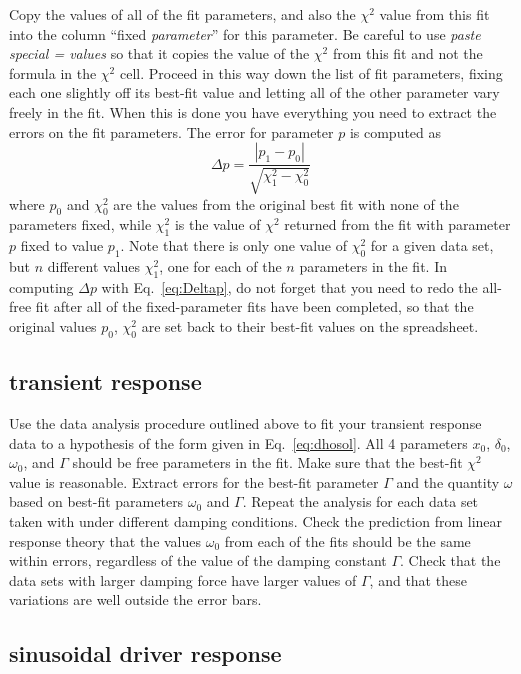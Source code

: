 \documentclass{revtex4}
\begin{document}
Copy the values
of all of the fit parameters, and also the $\chi^2$ value from this fit into
the column ``fixed {\em parameter}'' for this parameter.  Be careful to use
{\em paste special = values} so that it copies the value of the $\chi^2$
from this fit and not the formula in the $\chi^2$ cell.  Proceed in this
way down the list of fit parameters, fixing each one slightly off its 
best-fit value and letting all of the other parameter vary freely in the fit.
When this is done you have everything you need to extract the errors on the
fit parameters.  The error for parameter $p$ is computed as
\begin{equation}
\Delta p = \frac{|p_1 - p_0|}{\sqrt{\chi^2_1-\chi^2_0}}
\label{eq:Deltap}
\end{equation}
where $p_0$ and $\chi^2_0$ are the values from the original best fit with
none of the parameters fixed, while $\chi^2_1$ is the value of $\chi^2$
returned from the fit with parameter $p$ fixed to value $p_1$.  Note that
there is only one value of $\chi^2_0$ for a given data set, but $n$ different
values $\chi^2_1$, one for each of the $n$ parameters in the fit.
In computing $\Delta p$ with Eq.~\ref{eq:Deltap}, do not forget that you
need to redo the all-free fit after all of the fixed-parameter fits have been
completed, so that the original values $p_0$, $\chi^2_0$ are set back
to their best-fit values on the spreadsheet.

\subsection{transient response}

Use the data analysis procedure outlined above to fit your transient
response data to a hypothesis of the form given in Eq.~\ref{eq:dhosol}.
All 4 parameters $x_0$, $\delta_0$, $\omega_0$, and $\Gamma$ should be
free parameters in the fit.  Make sure that the best-fit $\chi^2$ value
is reasonable.  Extract errors for the best-fit parameter $\Gamma$ and
the quantity $\omega$ based on best-fit parameters $\omega_0$ and $\Gamma$.
Repeat the analysis for each data set taken with under different damping
conditions.  Check the prediction from linear response theory that the
values $\omega_0$ from each of the fits should be the same within errors,
regardless of the value of the damping constant $\Gamma$.  Check that
the data sets with larger damping force have larger values of $\Gamma$,
and that these variations are well outside the error bars.

\subsection{sinusoidal driver response}
\end{document}
